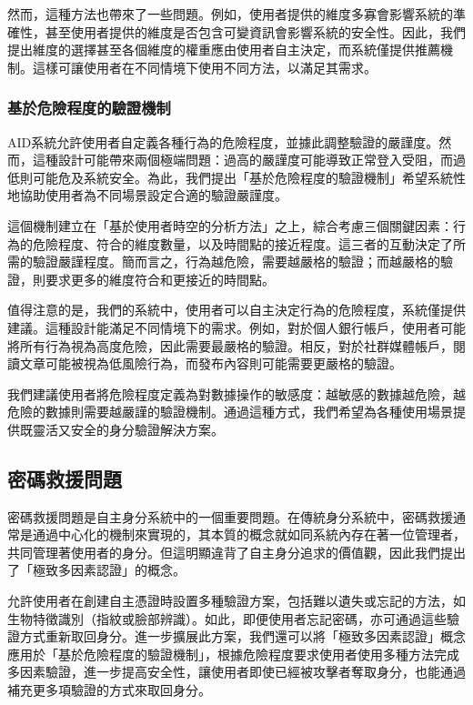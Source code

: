 然而，這種方法也帶來了一些問題。例如，使用者提供的維度多寡會影響系統的準確性，甚至使用者提供的維度是否包含可變資訊會影響系統的安全性。因此，我們提出維度的選擇甚至各個維度的權重應由使用者自主決定，而系統僅提供推薦機制。這樣可讓使用者在不同情境下使用不同方法，以滿足其需求。
\subsubsection{基於危險程度的驗證機制}
AID系統允許使用者自定義各種行為的危險程度，並據此調整驗證的嚴謹度。然而，這種設計可能帶來兩個極端問題：過高的嚴謹度可能導致正常登入受阻，而過低則可能危及系統安全。為此，我們提出「基於危險程度的驗證機制」希望系統性地協助使用者為不同場景設定合適的驗證嚴謹度。

這個機制建立在「基於使用者時空的分析方法」之上，綜合考慮三個關鍵因素：行為的危險程度、符合的維度數量，以及時間點的接近程度。這三者的互動決定了所需的驗證嚴謹程度。簡而言之，行為越危險，需要越嚴格的驗證；而越嚴格的驗證，則要求更多的維度符合和更接近的時間點。

值得注意的是，我們的系統中，使用者可以自主決定行為的危險程度，系統僅提供建議。這種設計能滿足不同情境下的需求。例如，對於個人銀行帳戶，使用者可能將所有行為視為高度危險，因此需要最嚴格的驗證。相反，對於社群媒體帳戶，閱讀文章可能被視為低風險行為，而發布內容則可能需要更嚴格的驗證。

我們建議使用者將危險程度定義為對數據操作的敏感度：越敏感的數據越危險，越危險的數據則需要越嚴謹的驗證機制。通過這種方式，我們希望為各種使用場景提供既靈活又安全的身分驗證解決方案。
\subsection{密碼救援問題}
密碼救援問題是自主身分系統中的一個重要問題。在傳統身分系統中，密碼救援通常是通過中心化的機制來實現的，其本質的概念就如同系統內存在著一位管理者，共同管理著使用者的身分。但這明顯違背了自主身分追求的價值觀，因此我們提出了「極致多因素認證」的概念。

允許使用者在創建自主憑證時設置多種驗證方案，包括難以遺失或忘記的方法，如生物特徵識別（指紋或臉部辨識）。如此，即便使用者忘記密碼，亦可通過這些驗證方式重新取回身分。進一步擴展此方案，我們還可以將「極致多因素認證」概念應用於「基於危險程度的驗證機制」，根據危險程度要求使用者使用多種方法完成多因素驗證，進一步提高安全性，讓使用者即使已經被攻擊者奪取身分，也能通過補充更多項驗證的方式來取回身分。
